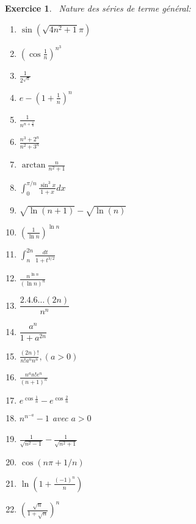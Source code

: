 \documentclass[12pt,a4paper]{article}
\theoremstyle{break}
\newtheorem{Exo}{Exercice}
\begin{document}
\begin{Exo}
\ 
Nature des séries  de terme général:
\begin{multicols}{3}
\begin{enumerate}
\item $\sin \left( \sqrt{4n^{2}+1}\pi \right)$
\item $\left( \cos \frac{1}{n}\right) ^{n^{3}}$
\item $\frac{1}{2^{\sqrt{n}}}$
\item $e-\left( 1+\frac{1}{n}\right) ^{n}$
\item $\frac{1}{n^{n+\frac{1}{n}}}$
\item $\frac{n^{3}+2^{n}}{n^{2}+3^{n}}$
\item $\arctan \frac{n}{n^{2}+1}$
\item $\int_{0}^{\pi /n}\frac{\sin ^{3}x}{1+x}dx$
\item $\sqrt{\ln (n+1)}-\sqrt{\ln(n)}$
\item $\left( \frac{1}{\ln n}\right) ^{\ln n}$
\item $\int_{n}^{2n}\frac{dt}{1+t^{3/2}}$
\item $\frac{n^{\ln n}}{\left( \ln n\right) ^{n}}$
\item $\dfrac{2.4.6\dots (2n)}{n^{n}}$
\item $\dfrac{a^{n}}{1+a^{2n}}$
\item $\frac{(2n)!}{n!a^{n}n^{n}},\left( a>0\right)$
\item $\frac{n^{a}n!e^{n}}{(n+1)^{n}}$
\item $e^{\cos \frac{1}{n}}-e^{\cos \frac{2}{n}}$
\item $n^{n^{-a}}-1$ avec $a>0$
\item $\frac{1}{\sqrt{n^2-1}}-\frac{1}{\sqrt{n^2+1}}$
\item $\cos(n\pi+1/n)$
\item $\ln\left(1+\frac{(-1)^n}{n} \right)$
\item $\left(\frac{\sqrt{n}}{1+\sqrt{n}}\right)^n$
\end{enumerate}
\end{multicols}

\end{Exo}
\end{document}
